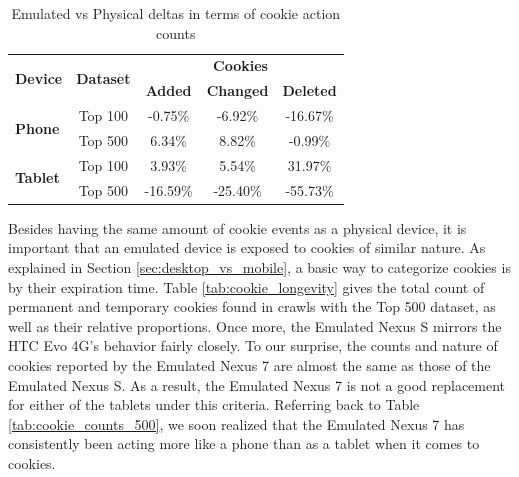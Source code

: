 \documentclass{acm_proc_article-sp}
\begin{document}
\begin{table}[h]
  \centering
  \caption{Emulated vs Physical deltas in terms of cookie action counts}
    \begin{tabular}{|c|c|c|c|c|}
    \hline
    \multicolumn{1}{|c|}{\multirow{2}[4]{*}{\textbf{Device}}} & \multicolumn{1}{|c|}{\multirow{2}[4]{*}{\textbf{Dataset}}} & \multicolumn{3}{|c|}{\textbf{Cookies}} \\ \cline{3-5}
    \multicolumn{1}{|c|}{} & \multicolumn{1}{|c|}{} & \multicolumn{1}{|c|}{\textbf{Added}} & \multicolumn{1}{|c|}{\textbf{Changed}} & \multicolumn{1}{|c|}{\textbf{Deleted}} \\ \hline
    \multicolumn{1}{|l|}{\multirow{2}[4]{*}{\textbf{Phone}}} & Top 100 & -0.75\% & -6.92\% & -16.67\% \\
    \multicolumn{1}{|l|}{} & Top 500 & 6.34\% & 8.82\% & -0.99\% \\
    \hline
    \multicolumn{1}{|l|}{\multirow{2}[4]{*}{\textbf{Tablet}}} & Top 100 & 3.93\% & 5.54\% & 31.97\% \\
    \multicolumn{1}{|l|}{} & Top 500 & -16.59\% & -25.40\% & -55.73\% \\ \hline
    \end{tabular}%
  \label{tab:cookie_deltas}%
\end{table}%


Besides having the same amount of cookie events as a physical device, it is important that an emulated device is exposed to cookies of similar nature. As explained in Section \ref{sec:desktop_vs_mobile}, a basic way to categorize cookies is by their expiration time. Table \ref{tab:cookie_longevity} gives the total count of permanent and temporary cookies found in crawls with the Top 500 dataset, as well as their relative proportions. Once more, the Emulated Nexus S mirrors the HTC Evo 4G's behavior fairly closely. To our surprise, the counts and nature of cookies reported by the Emulated Nexus 7 are almost the same as those of the Emulated Nexus S. As a result, the Emulated Nexus 7 is not a good replacement for either of the tablets under this criteria. Referring back to Table \ref{tab:cookie_counts_500}, we soon realized that the Emulated Nexus 7 has consistently been acting more like a phone than as a tablet when it comes to cookies.
\end{document}
